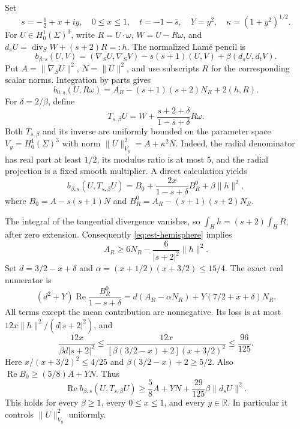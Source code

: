 \documentclass[11pt,a4paper]{article}
\theoremstyle{remark}
\numberwithin{equation}{section}
\begin{document}
Set
\[
 s=-\tfrac12+x+iy,\quad 0\le x\le1,\quad
 t=-1-\overline s,\quad Y=y^2,\quad \kappa=(1+y^2)^{1/2}.
\]
For $U\in H_0^1(\Sigma)^3$, write
$R=U\cdot\omega$, $W=U-R\omega$, and
$d_sU=\operatorname{div}_SW+(s+2)R=:h$.
The normalized Lam\'e pencil is
\[
 b_{\beta,s}(U,V)
 = (\nabla_SU,\nabla_SV)-s(s+1)(U,V)
       +\beta(d_sU,d_tV).
\]
Put $A=\|\nabla_SU\|^2$, $N=\|U\|^2$, and use subscripts $R$ for
the corresponding scalar norms. Integration by parts gives
\[
 b_{0,s}(U,R\omega)
 =A_R-(s+1)(s+2)N_R+2(h,R).
\]
For $\delta=2/\beta$, define
\[
 T_{s,\beta}U=W+
       \frac{s+2+\delta}{1-\overline s+\delta}R\omega.
\]
Both $T_{s,\beta}$ and its inverse are uniformly bounded on the parameter
space $V_y=H_0^1(\Sigma)^3$ with norm
$\|U\|_{V_y}^2=A+\kappa^2N$. Indeed, the radial denominator has real
part at least $1/2$, its modulus ratio is at most $5$, and the radial
projection is a fixed smooth multiplier. A direct calculation yields
\begin{equation}\label{eq:est-classical-cancel}
 b_{\beta,s}(U,T_{s,\beta}U)
 =B_0+\frac{2x}{1-s+\delta}B_R^0+\beta\|h\|^2,
\end{equation}
where
$B_0=A-s(s+1)N$ and
$B_R^0=A_R-(s+1)(s+2)N_R$.

The integral of the tangential divergence vanishes, so
$\int_Hh=(s+2)\int_HR$, after zero extension. Consequently
\eqref{eq:est-hemisphere} implies
\[
 A_R\ge6N_R-\frac{6}{|s+2|^2}\|h\|^2.
\]
Set $d=3/2-x+\delta$ and
$\alpha=(x+1/2)(x+3/2)\le15/4$. The exact real numerator is
\[
 (d^2+Y)\operatorname{Re}\frac{B_R^0}{1-s+\delta}
 =d(A_R-\alpha N_R)+Y(7/2+x+\delta)N_R.
\]
All terms except the mean contribution are nonnegative. Its loss is at
most $12x\|h\|^2/(d|s+2|^2)$, and
\[
 \frac{12x}{\beta d|s+2|^2}
 \le \frac{12x}{[\beta(3/2-x)+2](x+3/2)^2}
 \le\frac{96}{125}.
\]
Here $x/(x+3/2)^2\le4/25$ and
$\beta(3/2-x)+2\ge5/2$. Also
$\operatorname{Re}B_0\ge(5/8)A+YN$. Thus
\begin{equation}\label{eq:est-classical-coercive}
 \operatorname{Re}b_{\beta,s}(U,T_{s,\beta}U)
 \ge\frac58 A+YN+\frac{29}{125}\beta\|d_sU\|^2.
\end{equation}
This holds for every $\beta\ge1$, every $0\le x\le1$, and every
$y\in\mathbb R$. In particular it controls $\|U\|_{V_y}^2$ uniformly.
\end{document}
